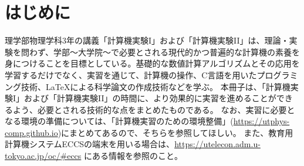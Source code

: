 \section*{はじめに}

\noindent
理学部物理学科3年の講義「計算機実験I」および「計算機実験II」は、理論・実験を問わず、学部〜大学院〜で必要とされる現代的かつ普遍的な計算機の素養を身につけることを目標としている。基礎的な数値計算アルゴリズムとその応用を学習するだけでなく、実習を通じて、計算機の操作、C言語を用いたプログラミング技術、\LaTeX による科学論文の作成技術などを学ぶ。
本冊子は、「計算機実験I」および「計算機実験II」の時間に、より効果的に実習を進めることができるよう、必要とされる技術的な点をまとめたものである。
なお、実習に必要となる環境の準備については、「計算機実習のための環境整備」(\url{https://utphys-comp.github.io})にまとめてあるので、そちらを参照してほしい。
また、教育用計算機システムECCSの端末を用いる場合は、\url{https://utelecon.adm.u-tokyo.ac.jp/oc/#eccs} にある情報を参照のこと。
